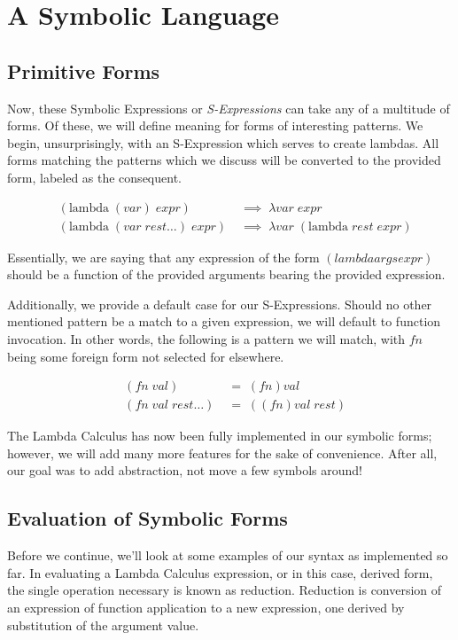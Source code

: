 \section{A Symbolic Language}
\subsection{Primitive Forms}
Now, these Symbolic Expressions or \emph{S-Expressions} can take any of a multitude of
forms. Of these, we will define meaning for forms of interesting patterns. We
begin, unsurprisingly, with an S-Expression which serves to create lambdas. All
forms matching the patterns which we discuss will be converted to the provided
form, labeled as the consequent.

\begin{figure}[htp]
\caption{}\label{scheme}
\begin{align*}
& (\text{lambda} \; (var) \; expr) \; &\implies \; \lambda var \; expr
\\& (\text{lambda} \; (var \; rest\dots) \; expr) \; &\implies \; \lambda var \; (\text{lambda} \; rest \; expr)
\end{align*}
\end{figure}

Essentially, we are saying that any expression of the form $(lambda args expr)$
should be a function of the provided arguments bearing the provided expression. 

Additionally, we provide a default case for our S-Expressions. Should no other
mentioned pattern be a match to a given expression, we will default to function
invocation. In other words, the following is a pattern we will match, with $fn$
being some foreign form not selected for elsewhere. 

\begin{figure}[htp]
\caption{}\label{scheme}
\begin{align*}
& (fn \; val) \; &= \; (fn)val
\\& (fn \; val \; rest\dots) \; &= \; ((fn)val \; rest)
\end{align*}
\end{figure}

The Lambda Calculus has now been fully implemented in our symbolic forms; however, 
we will add many more features for the sake of convenience. After all, our goal
was to add abstraction, not move a few symbols around!


\subsection{Evaluation of Symbolic Forms}
Before we continue, we'll look at some examples of our syntax as implemented so
far. In evaluating a Lambda Calculus expression, or in this case, derived form,
the single operation necessary is known as reduction. Reduction is conversion of
an expression of function application to a new expression, one derived by
substitution of the argument value.

